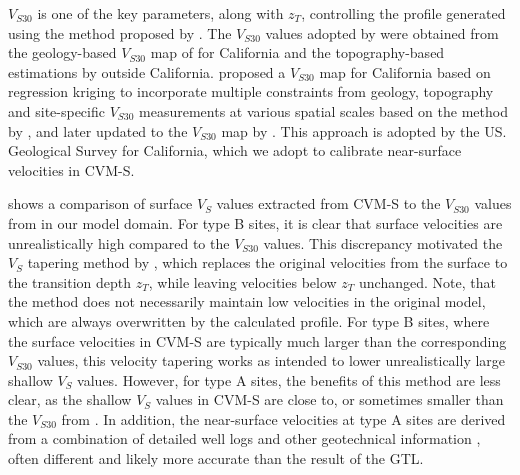 $V_{S30}$ is one of the key parameters, along with $z_T$, controlling the profile generated using the method proposed by \citet{elyVs30derivedNearsurfaceSeismic2010}. The $V_{S30}$ values adopted by \citet{elyVs30derivedNearsurfaceSeismic2010} were obtained from the geology-based $V_{S30}$ map of \citet{willsDevelopingMapGeologically2006} for California and the topography-based estimations by \citet{waldTopographicSlopeProxy2007} outside California. \citet{thompsonVS30MapCalifornia2014} proposed a $V_{S30}$ map for California based on regression kriging to incorporate multiple constraints from geology, topography and site-specific $V_{S30}$ measurements at various spatial scales based on the method by \citet{willsDevelopingMapGeologically2006}, and later updated to the $V_{S30}$ map by \citet{willsNextGeneration302015}. This approach is adopted by the US. Geological Survey \citep{thompsonUpdatedVs30Map2018} for California, which we adopt to calibrate near-surface velocities in CVM-S.

 shows a comparison of surface $V_S$ values extracted from CVM-S to the $V_{S30}$ values from \citet{thompsonUpdatedVs30Map2018} in our model domain. For type B sites, it is clear that surface velocities are unrealistically high compared to the $V_{S30}$ values. This discrepancy motivated the $V_S$ tapering method by \citet{elyVs30derivedNearsurfaceSeismic2010}, which replaces the original velocities from the surface to the transition depth $z_T$, while leaving velocities below $z_T$ unchanged. Note, that the \citet{elyVs30derivedNearsurfaceSeismic2010} method does not necessarily maintain low velocities in the original model, which are always overwritten by the calculated profile. For type B sites, where the surface velocities in CVM-S are typically much larger than the corresponding $V_{S30}$ values, this velocity tapering works as intended to lower unrealistically large shallow $V_S$ values. However, for type A sites, the benefits of this method are less clear, as the shallow $V_S$ values in CVM-S are close to, or sometimes smaller than the $V_{S30}$ from \citet{thompsonUpdatedVs30Map2018}. In addition, the near-surface velocities at type A sites are derived from a combination of detailed well logs and other geotechnical information \citep{magistraleSCECSouthernCalifornia2000,smallSCECUnifiedCommunity2017}, often different and likely more accurate than the result of the \citet{elyVs30derivedNearsurfaceSeismic2010} GTL.

